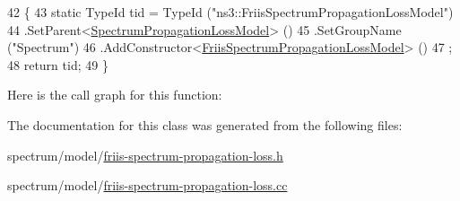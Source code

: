 \begin{DoxyCode}
42 \{
43   \textcolor{keyword}{static} TypeId tid = TypeId (\textcolor{stringliteral}{"ns3::FriisSpectrumPropagationLossModel"})
44     .SetParent<\hyperlink{classns3_1_1SpectrumPropagationLossModel_a0cd63e474494f365e120172c23966c82}{SpectrumPropagationLossModel}> ()
45     .SetGroupName (\textcolor{stringliteral}{"Spectrum"})
46     .AddConstructor<\hyperlink{classns3_1_1FriisSpectrumPropagationLossModel_ac24ecc073045b229610cf65e63cc8b52}{FriisSpectrumPropagationLossModel}> ()
47   ;
48   \textcolor{keywordflow}{return} tid;
49 \}
\end{DoxyCode}


Here is the call graph for this function\+:




The documentation for this class was generated from the following files\+:\begin{DoxyCompactItemize}
\item 
spectrum/model/\hyperlink{friis-spectrum-propagation-loss_8h}{friis-\/spectrum-\/propagation-\/loss.\+h}\item 
spectrum/model/\hyperlink{friis-spectrum-propagation-loss_8cc}{friis-\/spectrum-\/propagation-\/loss.\+cc}\end{DoxyCompactItemize}
